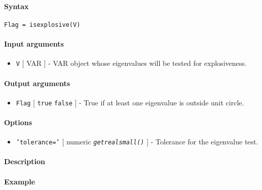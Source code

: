 


	\paragraph{Syntax}\label{syntax}

\begin{verbatim}
Flag = isexplosive(V)
\end{verbatim}

\paragraph{Input arguments}\label{input-arguments}

\begin{itemize}
\itemsep1pt\parskip0pt
\item
  \texttt{V} {[} VAR {]} - VAR object whose eigenvalues will be tested
  for explosiveness.
\end{itemize}

\paragraph{Output arguments}\label{output-arguments}

\begin{itemize}
\itemsep1pt\parskip0pt
\item
  \texttt{Flag} {[} \texttt{true} \textbar{} \texttt{false} {]} - True
  if at least one eigenvalue is outside unit circle.
\end{itemize}

\paragraph{Options}\label{options}

\begin{itemize}
\itemsep1pt\parskip0pt
\item
  \texttt{'tolerance='} {[} numeric \textbar{}
  \emph{\texttt{getrealsmall()}} {]} - Tolerance for the eigenvalue
  test.
\end{itemize}

\paragraph{Description}\label{description}

\paragraph{Example}\label{example}


